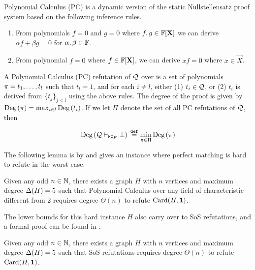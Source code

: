 \documentclass[11pt]{article}
\begin{document}
Polynomial Calculus (PC) is a dynamic version of the static Nullstellensatz proof system \citep[Section 1.3]{fleming2019semialgebraic} based on the following inference rules.
\begin{enumerate}
	\item From polynomials $f=0$ and $g=0$ where $f,g \in \mathbb{F}[\mathbf{X}]$ we can derive $\alpha f + \beta g = 0$ for $\alpha, \beta \in \mathbb{F}$.
	\item From polynomial $f=0$ where $f \in \mathbb{F}[\mathbf{X}]$, we can derive $xf=0$ where $x \in \vec{X}$.
\end{enumerate}

\begin{definition}\label{def:poly-calc-refutations}
A Polynomial Calculus (PC) refutation of $\mathcal{Q}$ over is a set of polynomials $\pi = t_1, \dots, t_l$	such that $t_l = 1$, and for each $i \neq l$, either (1) $t_i \in \mathcal{Q}$, or (2) $t_i$ is derived from $\{t_j\}_{j < i}$ using the above rules. 
The degree of the proof is given by $\text{Deg}\left(\pi\right) = \max_{i \in l}\text{Deg}\left(t_i\right)$. If we let $\Pi$ denote the set of all PC refutations of $\mathcal{Q}$, then  

\[ \text{Deg}\left(\mathcal{Q} \vdash_{\texttt{PC}_F} \bot\right) \text{}\overset{\mathtt{def}}{=} \min_{\pi \in \Pi}\text{Deg}\left(\pi\right)\]
\end{definition}

The following lemma is by \citet{buss1999linear} and gives an instance where perfect matching is hard to refute in the worst case.
\begin{lemma}\label{lemma:worst-case-instance-PC}Given any odd $n \in \mathbb{N}$, there exists a graph $H$ with $n$ vertices and maximum degree $\Delta(H)= 5$ such that Polynomial Calculus over any field of characteristic different from 2 requires degree $\Theta(n)$ to refute $\text{Card}(H, \mathbf{1})$.
\end{lemma}

The lower bounds for this hard instance $H$ also carry over to SoS refutations, and a formal proof can be found in \citep[Theorem A.3]{Austrin_2022}.

\begin{lemma}\label{lemma:worst-case-instance-sos}
Given any odd $n \in \mathbb{N}$, there exists a graph $H$ with $n$ vertices and maximum degree $\Delta(H)= 5$ such that SoS refutations requires degree $\Theta(n)$ to refute $\text{Card}(H, \mathbf{1})$.
\end{lemma}
\end{document}
